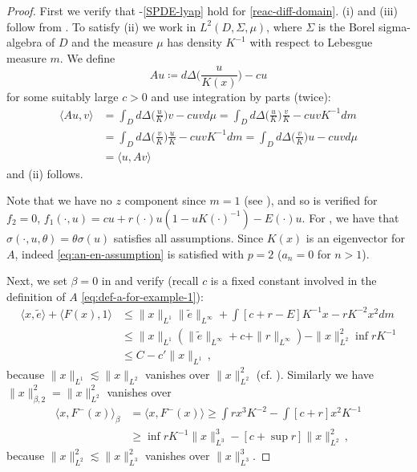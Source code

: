 \documentclass[final]{amsart}
\numberwithin{thm}{section}
\numberwithin{equation}{section}
\newcommand{\ip}[2]{\langle #1, #2 \rangle}
\begin{document}
\begin{proof}
First we verify that -\ref{SPDE-lyap} hold for \eqref{reac-diff-domain}.  (i) and (iii) follow from .  To satisfy  (ii) we work in $L^2(D,\Sigma,\mu)$, where $\Sigma$ is the Borel sigma-algebra of $D$ and the measure $\mu$ has density $K^{-1}$ with respect to Lebesgue measure $m$. We define
\begin{equation}\label{eq:def-a-for-example-1}
    Au \coloneqq d\Delta\Big(\frac{u}{K(x)}\Big) - cu
\end{equation}
for some suitably large $c > 0$ and use integration by parts (twice):
\begin{align*}
    \ip{Au}{v} &= \int_D d\Delta\Big(\frac{u}{K}\Big)v - cuvd\mu = \int_D d\Delta\Big(\frac{u}{K}\Big)\frac{v}{K} -cuvK^{-1}dm \\
    &= \int_D d\Delta\Big(\frac{v}{K}\Big)\frac{u}{K} - cuvK^{-1}dm = \int_D d\Delta\Big(\frac{v}{K}\Big)u -cuvd\mu \\
    &= \ip{u}{Av} 
\end{align*}
and  (ii) follows. 

Note that we have no $z$ component since $m = 1$ (see ), and so  is verified for $f_2 = 0$, $f_1(\cdot,u) = cu + r(\cdot)u(1-uK(\cdot)^{-1}) - E(\cdot)u$. For , we have that $\sigma(\cdot,u,\theta) = \theta\sigma(u)$ satisfies all assumptions. Since $K(x)$ is an eigenvector for $A$, indeed \eqref{eq:an-en-assumption} is satisfied with $p = 2$ ($a_n = 0$ for $n > 1$).



Next, we set $\beta = 0$ in  and verify  (recall $c$ is a fixed constant involved in the definition of $A$ \eqref{eq:def-a-for-example-1}):
\begin{align*}
    \ip{x}{\tilde e} + \ip{F(x)}{1} &\leq \|x\|_{L^1}\|\tilde e\|_{L^\infty} + \int [c+r-E]K^{-1}x - rK^{-2}x^2 dm \\
    &\leq \|x\|_{L^1}(\|\tilde e\|_{L^\infty} + c + \|r\|_{L^\infty}) - \|x\|_{L^2}^2\inf rK^{-1} \\
    &\leq C - c'\|x\|_{L^1} \,,
\end{align*}
because $\|x\|_{L^1} \lesssim \|x\|_{L^2}$ vanishes over $\|x\|_{L^2}^2$ (cf. ). Similarly we have $\|x\|_{\beta,2}^2 = \|x\|_{L^2}^2$ vanishes over
\begin{align*}
   \ip{x}{F^-(x)}_\beta &= \ip{x}{F^-(x)} \geq \int rx^3K^{-2} - \int [c+r]x^2K^{-1} \\
   &\geq \inf rK^{-1}\|x\|_{L^3}^3 - [c+\sup r]\|x\|_{L^2}^2 \,,
\end{align*}
because $\|x\|_{L^2}^2 \lesssim \|x\|_{L^3}^2$ vanishes over $\|x\|_{L^3}^3$.


\end{proof}
\end{document}
